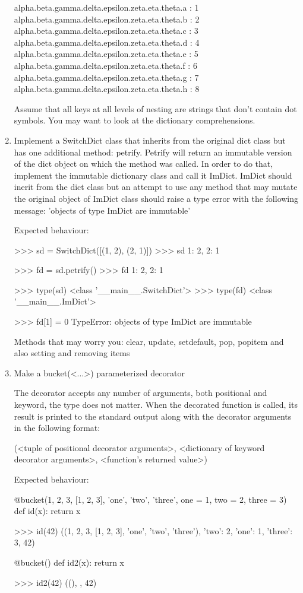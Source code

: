 \documentclass[]{article}
\begin{document}
\begin{enumerate}
alpha.beta.gamma.delta.epsilon.zeta.eta.theta.a : 1
alpha.beta.gamma.delta.epsilon.zeta.eta.theta.b : 2
alpha.beta.gamma.delta.epsilon.zeta.eta.theta.c : 3
alpha.beta.gamma.delta.epsilon.zeta.eta.theta.d : 4
alpha.beta.gamma.delta.epsilon.zeta.eta.theta.e : 5
alpha.beta.gamma.delta.epsilon.zeta.eta.theta.f : 6
alpha.beta.gamma.delta.epsilon.zeta.eta.theta.g : 7
alpha.beta.gamma.delta.epsilon.zeta.eta.theta.h : 8


Assume that all keys at all levels of nesting are strings that don't contain dot symbols.
You may want to look at the dictionary comprehensions.

\item
Implement a SwitchDict class that inherits from the original dict class but has one additional method: petrify. Petrify will return an immutable version of the dict object on which the method was called. In order to do that, implement the immutable dictionary class and call it ImDict. ImDict should inerit from the dict class but an attempt to use any method that may mutate the original object of ImDict class should raise a type error with the following message: 'objects of type ImDict are immutable'

Expected behaviour:

>>> sd = SwitchDict([(1, 2), (2, 1)])
>>> sd
{1: 2, 2: 1}

>>> fd = sd.petrify()
>>> fd
{1: 2, 2: 1}

>>> type(sd)
<class '__main__.SwitchDict'>
>>> type(fd)
<class '__main__.ImDict'>

>>> fd[1] = 0
TypeError: objects of type ImDict are immutable


Methods that may worry you: clear, update, setdefault, pop, popitem and also setting and removing items
\item


Make a bucket(<...>) parameterized decorator

The decorator accepts any number of arguments, both positional and keyword, the type does not matter. When the decorated function is called, its result is printed to the standard output along with the decorator arguments in the following format:

(<tuple of positional decorator arguments>, <dictionary of keyword decorator arguments>, <function's returned value>)

 

Expected behaviour:

@bucket(1, 2, 3, [1, 2, 3], 'one', 'two', 'three', one = 1, two = 2, three = 3)
def id(x):
  return x

>>> id(42)
((1, 2, 3, [1, 2, 3], 'one', 'two', 'three'), {'two': 2, 'one': 1, 'three': 3}, 42)



@bucket()
def id2(x):
  return x

>>> id2(42)
((), {}, 42)



\end{enumerate}
\end{document}
